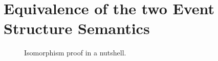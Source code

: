 
\section{Equivalence of the two Event Structure Semantics}\label{sec:results}




\begin{figure}[h]
\centering\footnotesize
\begin{minipage}{8cm}
\end{minipage}
\caption{Isomorphism proof in a nutshell.}\label{ipn}\end{figure}


